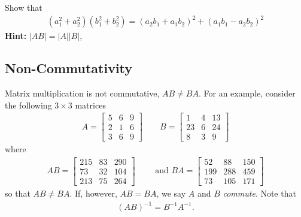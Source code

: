 \begin{homework}
	Show that 
	\begin{align}
		\left(a_1^2 + a_2^2\right)\left(b_1^2 + b_2^2\right) = \left(a_2 b_1 + a_1 b_2\right)^2 + \left(a_1 b_1 - a_2 b_2\right)^2
	\end{align}
	\textbf{Hint:}  $|A B | = |A| |B|$, 
\end{homework}

\subsection{Non-Commutativity}

Matrix multiplication is not commutative, \ie $AB \neq BA$. For an example, consider the following $3\times3$ matrices
%
\begin{align}
	A = \begin{bmatrix}
	5 & 6 & 9 \\
	2 & 1  & 6 \\
	3 & 6 & 9
	\end{bmatrix} 
	\qquad 
	B = \begin{bmatrix}
	1   &  4  &  13 \\
	23  &   6  &  24 \\
	8   &  3    & 9
	\end{bmatrix} 
\end{align}
%
where
%
\begin{align}
	AB = \begin{bmatrix}
	215  &  83 &  290 \\
	73  &  32 &  104 \\
	213  &  75 &  264
	\end{bmatrix} 
	\qquad
	\text{ and }
	BA = \begin{bmatrix}
	52   & 88  & 150 \\
	199 &  288 &  459 \\
	73 &  105 &  171
	\end{bmatrix} 
\end{align}
%
so that $AB \neq BA$. If, however, $AB = BA$, we say $A$ and $B$ \textit{commute}. Note that 
%
\begin{align}
	(AB)^{-1} = B^{-1} A^{-1}.
\end{align}

